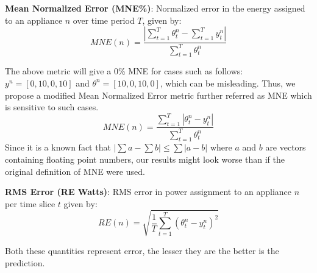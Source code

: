\documentclass[conference]{IEEEtran}
\begin{document}
\noindent\textbf{Mean Normalized Error (MNE\%)}: Normalized error in the energy assigned to an appliance $n$ over time period $T$, given by:
\begin{equation}
MNE(n)=\frac{|\sum\limits_{t=1}^{T}\theta_t^n-\sum\limits_{t=1}^{T}y_t^n|}{\sum\limits_{t=1}^{T}\theta_t^n} 
\end{equation} 

\noindent The above metric will give a 0\% MNE for cases such as follows: $y^n=[0,10,0,10]$ and $\theta^n=[10,0,10,0]$, which can be misleading. Thus, we propose a modified Mean Normalized Error metric further referred as MNE which is sensitive to such cases.
\begin{equation}
MNE(n)=\frac{\sum\limits_{t=1}^{T}|\theta_t^n-y_t^n|}{\sum\limits_{t=1}^{T}\theta_t^n} 
\end{equation} 
\noindent Since it is a known fact that $|\sum a-\sum b| \le \sum|a-b|$ where $a$ and $b$ are vectors containing floating point numbers, our results might look worse than if the original definition of MNE were used.

\noindent\textbf{RMS Error (RE Watts)}: RMS error in power assignment to an appliance $n$ per time slice $t$ given by:
\begin{equation}
RE(n)=\sqrt{\frac{1}{T}\sum\limits_{t=1}^{T}(\theta_t^n-y_t^n)^2}
\end{equation}


\noindent Both these quantities represent error, the lesser they are the better is the prediction.

\end{document}
